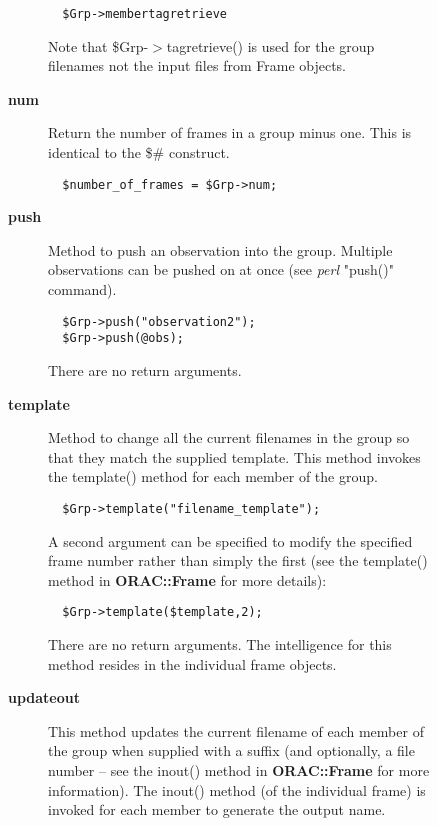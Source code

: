 \begin{description}
\begin{description}
\begin{description}
\begin{verbatim}
  $Grp->membertagretrieve
\end{verbatim}


Note that \$Grp-$>$tagretrieve() is used for the group filenames
not the input files from Frame objects.


\item[{\textbf{num}}] \mbox{}

Return the number of frames in a group minus one.
This is identical to the \$\# construct.

\begin{verbatim}
  $number_of_frames = $Grp->num;
\end{verbatim}

\item[{\textbf{push}}] \mbox{}

Method to push an observation into the group. Multiple observations
can be pushed on at once (see \emph{perl} "push()" command).

\begin{verbatim}
  $Grp->push("observation2");
  $Grp->push(@obs);
\end{verbatim}


There are no return arguments.


\item[{\textbf{template}}] \mbox{}

Method to change all the current filenames in the group so that they
match the supplied template. This method invokes the template()
method for each member of the group.

\begin{verbatim}
  $Grp->template("filename_template");
\end{verbatim}


A second argument can be specified to modify the specified frame
number rather than simply the first (see the template() method
in \textbf{ORAC::Frame} for more details):

\begin{verbatim}
  $Grp->template($template,2);
\end{verbatim}


There are no return arguments. The intelligence for this method resides
in the individual frame objects.


\item[{\textbf{updateout}}] \mbox{}

This method updates the current filename of each member of the group
when supplied with a suffix (and optionally, a file number -- see the
inout() method in \textbf{ORAC::Frame} for more information). The inout()
method (of the individual frame) is invoked for each member to
generate the output name.


\end{description}
\end{description}
\end{description}
